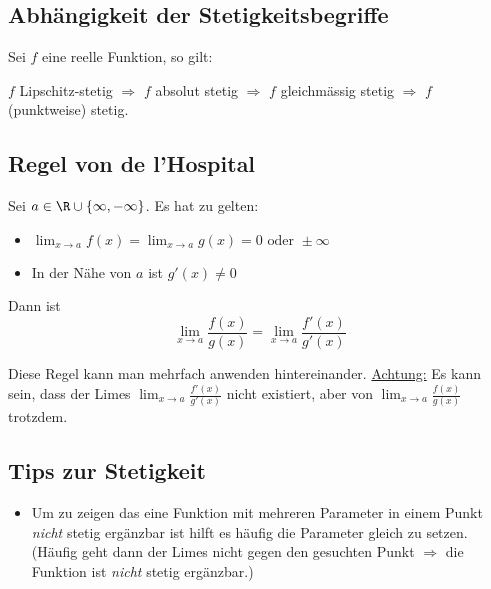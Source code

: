 \subsection{Abhängigkeit der Stetigkeitsbegriffe}
Sei $f$ eine reelle Funktion, so gilt:

$f$ Lipschitz-stetig $\Rightarrow$ $f$ absolut stetig $\Rightarrow$ $f$
gleichmässig stetig $\Rightarrow$ $f$ (punktweise) stetig.

\subsection{Regel von de l'Hospital}
Sei $a \in \R \cup \{\infty, -\infty\}$. Es hat zu gelten:
\begin{itemize}
  \item $\lim_{x \to a} f(x) = \lim_{x \to a} g(x) = 0 \text{ oder } \pm\infty$
  \item In der Nähe von $a$ ist $g'(x) \neq 0$
\end{itemize}

Dann ist
\[
\lim_{x \to a} \frac{f(x)}{g(x)} = \lim_{x \to a}
\frac{f'(x)}{g'(x)}
\]

Diese Regel kann man mehrfach anwenden hintereinander. \underline{Achtung:} Es
kann sein, dass der Limes $\lim_{x \to a} \frac{f'(x)}{g'(x)}$ nicht existiert,
aber von $\lim_{x \to a} \frac{f(x)}{g(x)}$ trotzdem.


\subsection{Tips zur Stetigkeit}
\begin{itemize}
  \item Um zu zeigen das eine Funktion mit mehreren Parameter in einem Punkt \emph{nicht} stetig ergänzbar ist
	hilft es häufig die Parameter gleich zu setzen. (Häufig geht dann der Limes nicht gegen den gesuchten Punkt
	 $\Rightarrow$ die Funktion ist \emph{nicht} stetig ergänzbar.)
\end{itemize}
